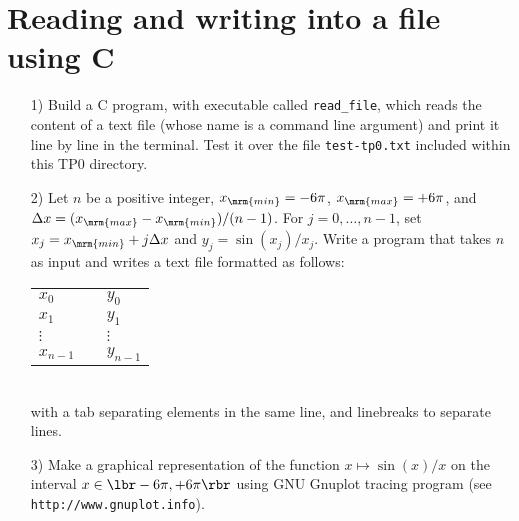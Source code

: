 \documentclass[a4paper,12pt]{article}
\begin{document}
\section{Reading and writing into a file using C}

\begin{itemize}

\item[1)] Build a C program, with executable called \texttt{read\_file},
  which reads the content of a text file (whose name is a command line argument) 
  and print it line by line in the terminal. Test it over the file 
  \texttt{test-tp0.txt} included within this TP0 directory.\\
  
\item[2)] Let $n$ be a positive integer, $x_{\mrm{min}} = -6\pi$, $x_{\mrm{max}} = +6\pi$, and $
  \Delta x = (x_{\mrm{max}}-x_{\mrm{min}})/(n-1)$. For $j=0,\dots, n-1$, set  
  $x_j = x_{\mrm{min}} + j \Delta x$ and $y_j = \sin(x_j)/x_j$. Write a program that
  takes $n$ as input and writes a text file formatted as follows:\\[10pt]
  \begin{tabular}{lll}
    $x_0$ & &$y_0$\\
    $x_1$ & &$y_1$\\
    $\vdots$ && $\vdots$\\
    $x_{n-1}$ && $y_{n-1}$\\   
  \end{tabular}
  \quad\\[10pt]
  with a tab separating elements in the same line, and linebreaks to separate lines.\\

\item[3)] Make a graphical representation of the function $x\mapsto \sin(x)/x$ on the interval 
  $x\in \lbr-6\pi,+6\pi\rbr$ using GNU Gnuplot tracing program (see \texttt{http://www.gnuplot.info}).

\end{itemize}
\end{document}
